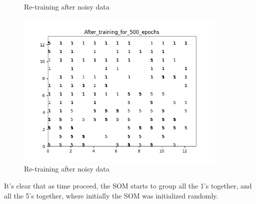 \documentclass[11pt]{article}
\begin{document}
\begin{enumerate}
\begin{enumerate}
\begin{figure}[h!]
\begin{minipage}{0.45\textwidth}
         \caption{Re-training after noisy data}
    \end{minipage}\hfill
    \begin{minipage}{0.45\textwidth}
    	\centering
         \includegraphics[width=0.9\textwidth]{After_training_for_500_epochs}
         \caption{Re-training after noisy data}
    \end{minipage}\hfill
\end{figure}
It's clear that as time proceed, the SOM starts to group all the 1's together, and all the 5's together, where initially the SOM was initialized randomly.


\end{enumerate}
\end{enumerate}
\end{document}
